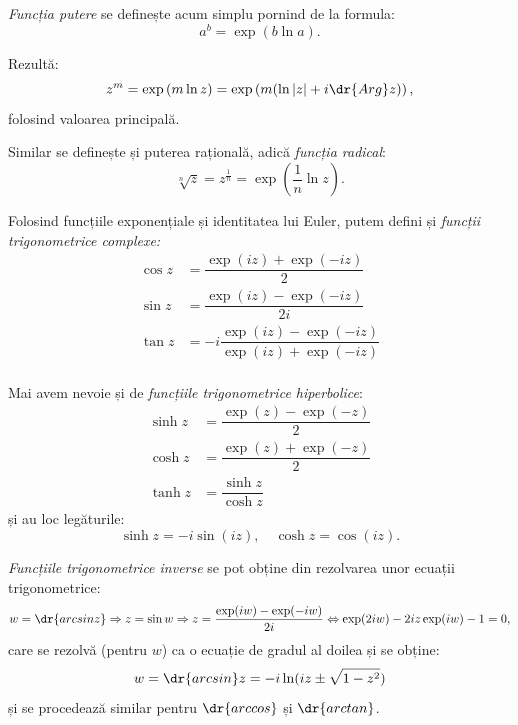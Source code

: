 \emph{Funcția putere} se definește acum simplu pornind de la formula:
\[
  a^b = \exp\left(b \ln a\right).
\]

Rezultă:
\[
  z^m = \exp\left(m \ln z\right) = \exp \left( m(\ln|z| + i\dr{Arg}z) \right),
\]
folosind valoarea principală.

Similar se definește și puterea rațională, adică \emph{funcția radical}:
\[
  \sqrt[n]{z} = z^{\frac{1}{n}} = \exp\left( \dfrac{1}{n} \ln z \right).
\]

Folosind funcțiile exponențiale și identitatea lui Euler, putem defini și
\emph{funcții trigonometrice complexe:}
\begin{align*}
  \cos z &= \dfrac{\exp(iz) + \exp(-iz)}{2} \\
  \sin z &= \dfrac{\exp(iz) - \exp(-iz)}{2i} \\
  \tan z &= -i\dfrac{\exp(iz) - \exp(-iz)}{\exp(iz) + \exp(-iz)} \\
\end{align*}

Mai avem nevoie și de \emph{funcțiile trigonometrice hiperbolice}:
\begin{align*}
  \sinh z &= \dfrac{\exp(z) - \exp(-z)}{2} \\
  \cosh z &= \dfrac{\exp(z) + \exp(-z)}{2} \\
  \tanh z &= \dfrac{\sinh z}{\cosh z}
\end{align*}
și au loc legăturile:
\[
  \sinh z = -i\sin(iz), \quad \cosh z = \cos(iz).
\]

\emph{Funcțiile trigonometrice inverse} se pot obține din rezolvarea unor
ecuații trigonometrice\footnotemark:
\[
  w = \dr{arcsin z} \Rightarrow z = \sin w \Rightarrow %
  z = \dfrac{\exp(iw) - \exp(-iw)}{2i} \Leftrightarrow %
  \exp(2iw) - 2iz\exp(iw) - 1 = 0,
\]
care se rezolvă (pentru $ w $) ca o ecuație de gradul al doilea și se obține:
\[
  w = \dr{arcsin} z = -i\ln(iz \pm \sqrt{1 - z^2})
\]
și se procedează similar pentru $ \dr{arccos} $ și $ \dr{arctan} $.



